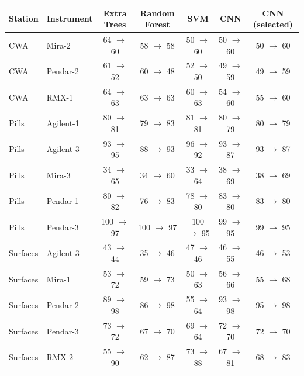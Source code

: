 \begin{tabular}{llccccc}
\toprule
Station & Instrument & Extra Trees & Random Forest & SVM & CNN & CNN (selected) \\
\midrule
CWA & Mira-2 & 64 $\to$ 60 & 58 $\to$ 58 & 50 $\to$ 60 & 50 $\to$ 60 & 50 $\to$ 60 \\
CWA & Pendar-2 & 61 $\to$ 52 & 60 $\to$ 48 & 52 $\to$ 50 & 49 $\to$ 59 & 49 $\to$ 59 \\
CWA & RMX-1 & 64 $\to$ 63 & 63 $\to$ 63 & 60 $\to$ 63 & 54 $\to$ 60 & 55 $\to$ 60 \\
Pills & Agilent-1 & 80 $\to$ 81 & 79 $\to$ 83 & 81 $\to$ 81 & 80 $\to$ 79 & 80 $\to$ 79 \\
Pills & Agilent-3 & 93 $\to$ 95 & 88 $\to$ 93 & 96 $\to$ 92 & 93 $\to$ 87 & 93 $\to$ 87 \\
Pills & Mira-3 & 34 $\to$ 65 & 34 $\to$ 60 & 33 $\to$ 64 & 38 $\to$ 69 & 38 $\to$ 69 \\
Pills & Pendar-1 & 80 $\to$ 82 & 76 $\to$ 83 & 78 $\to$ 80 & 83 $\to$ 80 & 83 $\to$ 80 \\
Pills & Pendar-3 & 100 $\to$ 97 & 100 $\to$ 97 & 100 $\to$ 95 & 99 $\to$ 95 & 99 $\to$ 95 \\
Surfaces & Agilent-3 & 43 $\to$ 44 & 35 $\to$ 46 & 47 $\to$ 46 & 46 $\to$ 55 & 46 $\to$ 53 \\
Surfaces & Mira-1 & 53 $\to$ 72 & 59 $\to$ 73 & 50 $\to$ 63 & 56 $\to$ 66 & 55 $\to$ 68 \\
Surfaces & Pendar-2 & 89 $\to$ 98 & 86 $\to$ 98 & 55 $\to$ 64 & 93 $\to$ 98 & 95 $\to$ 98 \\
Surfaces & Pendar-3 & 73 $\to$ 72 & 67 $\to$ 70 & 69 $\to$ 64 & 72 $\to$ 70 & 72 $\to$ 70 \\
Surfaces & RMX-2 & 55 $\to$ 90 & 62 $\to$ 87 & 73 $\to$ 88 & 67 $\to$ 81 & 68 $\to$ 83 \\
\bottomrule
\end{tabular}
